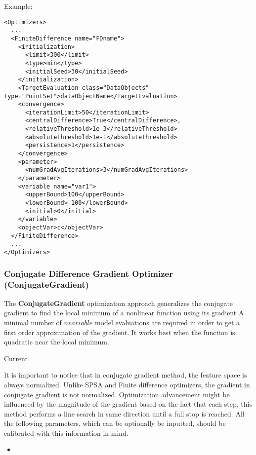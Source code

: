Example:
\begin{lstlisting}[style=XML]
<Optimizers>
  ...
  <FiniteDifference name="FDname">
    <initialization>
      <limit>300</limit>
      <type>min</type>
      <initialSeed>30</initialSeed>
    </initialization>
    <TargetEvaluation class="DataObjects" type="PointSet">dataObjectName</TargetEvaluation>
    <convergence>
      <iterationLimit>50</iterationLimit>
      <centralDifference>True</centralDifference>,
      <relativeThreshold>1e-3</relativeThreshold>
      <absoluteThreshold>1e-1</absoluteThreshold>
      <persistence>1</persistence>
    </convergence>
    <parameter>
      <numGradAvgIterations>3</numGradAvgIterations>
    </parameter>
    <variable name="var1">
      <upperBound>100</upperBound>
      <lowerBound>-100</lowerBound>
      <initial>0</initial>
    </variable>
    <objectVar>c</objectVar>
  </FiniteDifference>
  ...
</Optimizers>
\end{lstlisting}

\subsubsection{Conjugate Difference Gradient Optimizer (ConjugateGradient)}
\label{subsubsubsec:ConjugateGradient}
The \textbf{ConjugateGradient} optimization approach generalizes the conjugate gradient to find the local minimum
of a nonlinear function using its gradient
A minimal number of $n variable$ model evaluations are required in order to get a first order approximation of the gradient.
It works best when the function is quadratic near the local minimum.

Current 

It is important to notice that in conjugate gradient method, the feature space is always normalized. Unlike SPSA and Finite difference
optimizers, the gradient in conjugate gradient is not normalized. Optimization advancement might be influenced by the
magnitude of the gradient based on the fact that each step, this method performs a line search in same direction until a full stop is reached.
All the following parameters, which can be optionally be inputted, should be calibrated with this information in mind.

%

%
\attrsIntro
\vspace{-5mm}
\begin{itemize}
\itemsep0em
\item \nameDescription
\end{itemize}
\vspace{-5mm}

